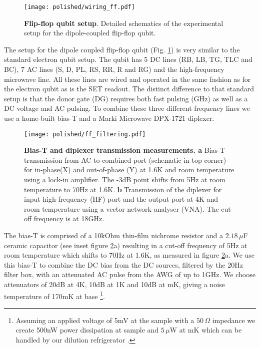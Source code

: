 \begin{figure}
	\centering
	\texttt{[image: polished/wiring\_ff.pdf]}
	\caption[Flip-flop qubit setup]{\textbf{Flip-flop qubit setup}. Detailed schematics of the experimental setup for the dipole-coupled flip-flop qubit.  }
	\label{fig:dd_setup}
\end{figure}

The setup for the dipole coupled flip-flop qubit (Fig. \ref{fig:dd_setup}) is very similar to the standard electron qubit setup. The qubit has 5 DC lines (RB, LB, TG,  TLC and BC), 7 AC lines (S, D, PL, RS, RR, R and RG) and the high-frequency microwave line. All these lines are wired and operated in the same fashion as for the electron qubit as is the SET readout. The distinct difference to that standard setup is that the donor gate (DG) requires both fast pulsing (GHz) as well as a DC voltage and AC pulsing. To combine these three different frequency lines we use a home-built bias-T and a Marki Microwave DPX-1721 diplexer. 

\begin{figure}
	\centering
	\texttt{[image: polished/ff\_filtering.pdf]}
	\caption[Bias-T and diplexer transmission measurements]{\textbf{Bias-T and diplexer transmission measurements. a} Bias-T transmission from AC to combined port (schematic in top corner) for in-phase(X) and out-of-phase (Y) at 1.6K and room temperature using a lock-in amplifier. The -3dB point shifts from 5Hz at room temperature to 70Hz at 1.6K. \textbf{b} Transmission of the diplexer for input high-frequency (HF) port and the output port at 4K and room temperature using a vector network analyser (VNA). The cut-off frequency is at 18GHz. }
	\label{fig:biast_diplexer}
\end{figure}

The bias-T is comprised of a 10kOhm thin-film nichrome resistor and a $2.18\,\mu$F ceramic capacitor (see inset figure \ref{fig:biast_diplexer}a) resulting in a cut-off frequency of 5Hz at room temperature which shifts to 70Hz at 1.6K, as measured in figure \ref{fig:biast_diplexer}a. We use this bias-T to combine the DC bias from the DC sources, filtered by the 20Hz filter box, with an attenuated AC pulse from the AWG of up to 1GHz. We choose attenuators of 20dB at 4K, 10dB at 1K and 10dB at mK, giving a noise temperature of 170mK at base
 \footnote{
 Assuming an applied voltage of 5mV at the sample with a $50\,\Omega$ impedance we create 500nW power dissipation at sample and $5\,\mu$W at mK which can be handled by our dilution refrigerator \cite{BlueforsManual}.}.  

